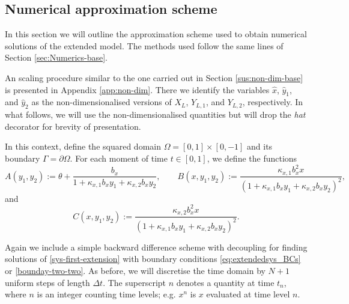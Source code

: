 \documentclass[11pt]{article}
\numberwithin{equation}{section}
\begin{document}
\subsection{Numerical approximation scheme}
\label{sec:Numerics-extension}

In this section we will outline the approximation scheme used to obtain numerical solutions of the extended model. The methods used follow the same lines of Section \ref{sec:Numerics-base}. 

An scaling procedure similar to the one carried out in Section \ref{sus:non-dim-base} is presented in Appendix \ref{app:non-dim}. There we identify the variables \( \hat x\), \(\hat y_1\), and \(\hat y_2\) as the non-dimensionalised versions of \(X_L\), \(Y_{L,1}\), and \(Y_{L,2}\), respectively. In what follows, we will use the non-dimensionalised quantities but will drop the \emph{hat} decorator for brevity of presentation.

In this context, define the squared domain \( \Omega = [0,1] \times [0,-1]\) and its boundary \( \Gamma = \partial \Omega\). For each moment of time \(t\in [0,1]\), we define the functions 
\[
    A(y_1, y_2) := \theta + \frac{b_x}{1 + \kappa_{x,1} b_{x} y_1 + \kappa_{x,2} b_{x} y_2},
    \qquad
    B(x, y_1, y_2) := \frac{\kappa_{x,1} b_x^2 x}{(1 + \kappa_{x,1} b_{x} y_1 + \kappa_{x,2} b_{x} y_2 )^2},
\]
and
\[
    C(x, y_1, y_2) := \frac{\kappa_{x,2} b_x^2 x}{(1 + \kappa_{x,1} b_{x} y_1 + \kappa_{x,2} b_{x} y_2 )^2}.
\]




Again we include a simple backward difference scheme with decoupling for finding solutions of \eqref{sys-first-extension} with boundary conditions \eqref{eq:extendedsys_BCs} or \eqref{bounday-two-two}. As before, we will discretise the time domain by \(N+1\) uniform steps of length \(\Delta t\). The superscript $n$ denotes a quantity at time $t_n$, where $n$ is an integer counting time levels; e.g. $x^n$ is $x$ evaluated at time level $n$. 
\end{document}
